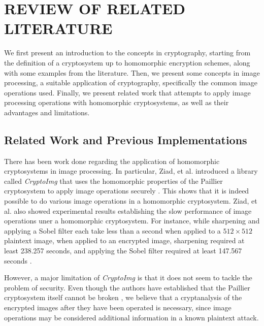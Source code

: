 \chapter{REVIEW OF RELATED LITERATURE}

We first present an introduction to the concepts in cryptography, starting from the definition of a cryptosystem up to homomorphic encryption schemes, along with some examples from the literature. Then, we present some concepts in image processing, a suitable application of cryptography, specifically the common image operations used. Finally, we present related work that attempts to apply image processing operations with homomorphic cryptosystems, as well as their advantages and limitations.




\section{Related Work and Previous Implementations}




There has been work done regarding the application of homomorphic cryptosystems in image processing. In particular, Ziad, et al. introduced a library called \textit{CryptoImg} that uses the homomorphic properties of the Paillier cryptosystem to apply image operations securely \cite{ziad_cryptoimg:_2016}. This shows that it is indeed possible to do various image operations in a homomorphic cryptosystem. Ziad, et al. also showed experimental results establishing the slow performance of image operations uner a homomorphic cryptosystem. For instance, while sharpening and applying a Sobel filter each take less than a second when applied to a $512\times 512$ plaintext image, when applied to an encrypted image, sharpening required at least 238.257 seconds, and applying the Sobel filter required at least 147.567 seconds \cite{ziad_cryptoimg:_2016}.

However, a major limitation of \textit{CryptoImg} is that it does not seem to tackle the problem of security. Even though the authors have established that the Paillier cryptosystem itself cannot be broken \cite{ziad_cryptoimg:_2016}, we believe that a cryptanalysis of the encrypted images after they have been operated is necessary, since image operations may be considered additional information in a known plaintext attack.

